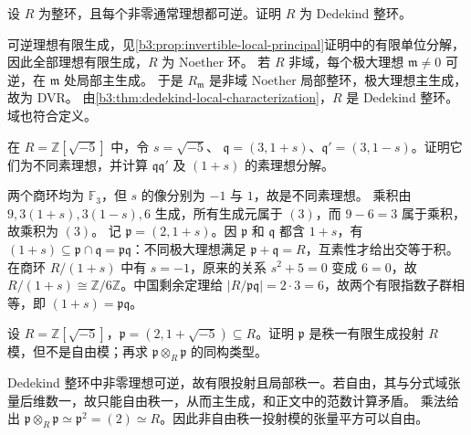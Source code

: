 \begin{exercise}\label{b3:ex:10-every-ideal-invertible}
	设 \(R\) 为整环，且每个非零通常理想都可逆。证明 \(R\) 为 Dedekind 整环。
\end{exercise}
\begin{solution}
	可逆理想有限生成，见\cref{b3:prop:invertible-local-principal}证明中的有限单位分解，因此全部理想有限生成，\(R\) 为 Noether 环。 若 \(R\) 非域，每个极大理想 \(\mathfrak m\ne0\) 可逆，在 \(\mathfrak m\) 处局部主生成。 于是 \(R_{\mathfrak m}\) 是非域 Noether 局部整环，极大理想主生成，故为 DVR。 由\cref{b3:thm:dedekind-local-characterization}，\(R\) 是 Dedekind 整环。域也符合定义。
\end{solution}

\begin{exercise}\label{b3:ex:10-quadratic-ideal-three}
	在 \(R=\mathbb Z[\sqrt{-5}]\) 中，令 \(s=\sqrt{-5}\)、 \(\mathfrak q=(3,1+s)\)、\(\mathfrak q'=(3,1-s)\)。证明它们为不同素理想，并计算 \(\mathfrak q\mathfrak q'\) 及 \((1+s)\) 的素理想分解。
\end{exercise}
\begin{solution}
	两个商环均为 \(\mathbb F_3\)，但 \(s\) 的像分别为 \(-1\) 与 \(1\)，故是不同素理想。 乘积由 \(9,3(1+s),3(1-s),6\) 生成，所有生成元属于 \((3)\)，而 \(9-6=3\) 属于乘积，故乘积为 \((3)\)。 记 \(\mathfrak p=(2,1+s)\)。因 \(\mathfrak p\) 和 \(\mathfrak q\) 都含 \(1+s\)，有 \((1+s)\subseteq\mathfrak p\cap\mathfrak q=\mathfrak p\mathfrak q\)：不同极大理想满足 \(\mathfrak p+\mathfrak q=R\)，互素性才给出交等于积。 在商环 \(R/(1+s)\) 中有 \(s=-1\)，原来的关系 \(s^2+5=0\) 变成 \(6=0\)，故 \(R/(1+s)\cong\mathbb Z/6\mathbb Z\)。中国剩余定理给 \(|R/\mathfrak p\mathfrak q|=2\cdot3=6\)，故两个有限指数子群相等，即 \((1+s)=\mathfrak p\mathfrak q\)。
\end{solution}

\begin{exercise}\label{b3:ex:10-invertible-nonfree}
	设 \(R=\mathbb Z[\sqrt{-5}]\)，\(\mathfrak p=(2,1+\sqrt{-5})\subseteq R\)。证明 \(\mathfrak p\) 是秩一有限生成投射 \(R\) 模，但不是自由模；再求 \(\mathfrak p\otimes_R\mathfrak p\) 的同构类型。
\end{exercise}
\begin{solution}
	Dedekind 整环中非零理想可逆，故有限投射且局部秩一。若自由，其与分式域张量后维数一，故只能自由秩一，从而主生成，和正文中的范数计算矛盾。 乘法给出 \(\mathfrak p\otimes_R\mathfrak p\simeq\mathfrak p^2=(2)\simeq R\)。因此非自由秩一投射模的张量平方可以自由。
\end{solution}

